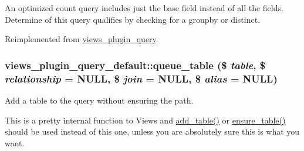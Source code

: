 An optimized count query includes just the base field instead of all the fields. Determine of this query qualifies by checking for a groupby or distinct.

Reimplemented from \hyperlink{classviews__plugin__query_a0609aead46ab39359c4bd5210338e819}{views\_\-plugin\_\-query}.\hypertarget{classviews__plugin__query__default_af3f53b356b6b979a0d511b14274a5bdb}{
\subsubsection[{queue\_\-table}]{\setlength{\rightskip}{0pt plus 5cm}views\_\-plugin\_\-query\_\-default::queue\_\-table (\$ {\em table}, \/  \$ {\em relationship} = {\ttfamily NULL}, \/  \$ {\em join} = {\ttfamily NULL}, \/  \$ {\em alias} = {\ttfamily NULL})}}
\label{classviews__plugin__query__default_af3f53b356b6b979a0d511b14274a5bdb}
Add a table to the query without ensuring the path.

This is a pretty internal function to Views and \hyperlink{classviews__plugin__query__default_a5a5bdfd26f77b8063efb0f6df5d9a232}{add\_\-table()} or \hyperlink{classviews__plugin__query__default_add3d47f9225b13269e9f51d9013d8970}{ensure\_\-table()} should be used instead of this one, unless you are absolutely sure this is what you want.


